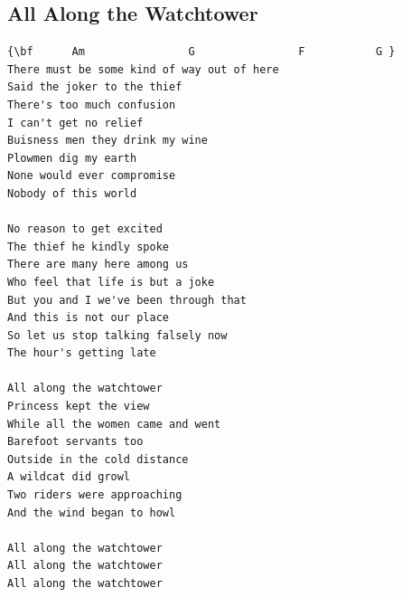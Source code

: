 \documentclass[a4paper]{article}
\begin{document}
\subsection{All Along the Watchtower} %
\label{sub:All Along the Watchtower}
\begin{Verbatim}[commandchars=\\\{\}]
{\bf 	  Am                G                F           G }
There must be some kind of way out of here
Said the joker to the thief
There's too much confusion
I can't get no relief
Buisness men they drink my wine
Plowmen dig my earth
None would ever compromise
Nobody of this world

No reason to get excited
The thief he kindly spoke
There are many here among us
Who feel that life is but a joke
But you and I we've been through that
And this is not our place
So let us stop talking falsely now
The hour's getting late

All along the watchtower
Princess kept the view
While all the women came and went
Barefoot servants too
Outside in the cold distance
A wildcat did growl
Two riders were approaching
And the wind began to howl

All along the watchtower
All along the watchtower
All along the watchtower
\end{Verbatim}
\newpage
\end{document}
